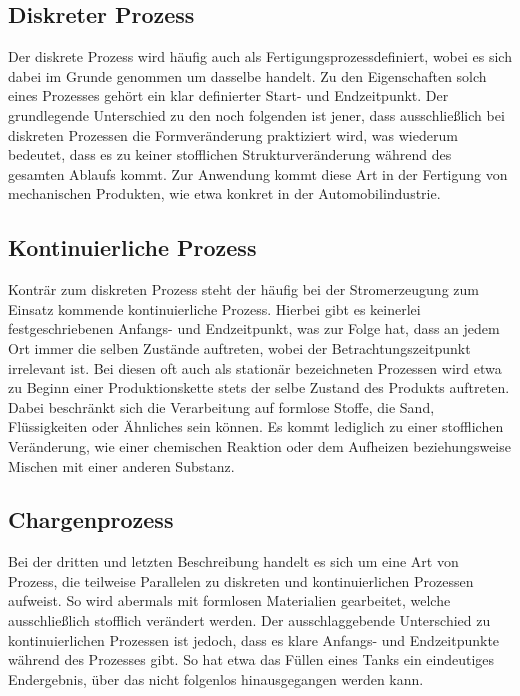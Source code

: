 	\subsection{Diskreter Prozess}
	Der diskrete Prozess wird häufig auch als \glqq Fertigungsprozess\grqq\space definiert, wobei es sich dabei im Grunde genommen um dasselbe handelt. Zu den Eigenschaften solch eines Prozesses gehört ein klar definierter Start- und Endzeitpunkt. Der grundlegende Unterschied zu den noch folgenden ist jener, dass ausschließlich bei diskreten Prozessen die Formveränderung praktiziert wird, was wiederum bedeutet, dass es zu keiner stofflichen Strukturveränderung während des gesamten Ablaufs kommt. Zur Anwendung kommt diese Art in der Fertigung von mechanischen Produkten, wie etwa konkret in der Automobilindustrie.
	
	\subsection{Kontinuierliche Prozess}
	Konträr zum diskreten Prozess steht der häufig bei der Stromerzeugung zum Einsatz kommende kontinuierliche Prozess. Hierbei gibt es keinerlei festgeschriebenen Anfangs- und Endzeitpunkt, was zur Folge hat, dass an jedem Ort immer die selben Zustände auftreten, wobei der Betrachtungszeitpunkt irrelevant ist. Bei diesen oft auch als stationär bezeichneten Prozessen wird etwa zu Beginn einer Produktionskette stets der selbe Zustand des Produkts auftreten. Dabei beschränkt sich die Verarbeitung auf formlose Stoffe, die Sand, Flüssigkeiten oder Ähnliches sein können. Es kommt lediglich zu einer stofflichen Veränderung, wie einer chemischen Reaktion oder dem Aufheizen beziehungsweise Mischen mit einer anderen Substanz.
	
	\subsection{Chargenprozess}
	Bei der dritten und letzten Beschreibung handelt es sich um eine Art von Prozess, die teilweise Parallelen zu diskreten und kontinuierlichen Prozessen aufweist. So wird abermals mit formlosen Materialien gearbeitet, welche ausschließlich stofflich verändert werden. Der ausschlaggebende Unterschied zu kontinuierlichen Prozessen ist jedoch, dass es klare Anfangs- und Endzeitpunkte während des Prozesses gibt. So hat etwa das Füllen eines Tanks ein eindeutiges Endergebnis, über das nicht folgenlos hinausgegangen werden kann.\\

